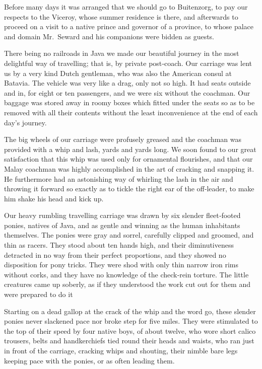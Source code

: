 \documentclass[12pt]{book}
\begin{document}
Before many days it was arranged that we should go to Buitenzorg, to pay
our respects to the Viceroy, whose summer residence is there, and afterwards to
proceed on a visit to a native prince and governor of a province, to whose palace
and domain Mr.~Seward and his companions were bidden as guests.

There being no railroads in Java we made our beautiful journey in the most
delightful way of travelling; that is, by private post‐coach. Our carriage was lent
us by a very kind Dutch gentleman, who was also the American consul at Batavia.
The vehicle was very like a drag, only not so high. It had seats outside and in, for
eight or ten passengers, and we were six without the coachman. Our baggage
was stored away in roomy boxes which fitted under the seats so as to be removed
with all their contents without the least inconvenience at the end of each day’s
journey.

The big wheels of our carriage were profusely greased and the coachman was
provided with a whip and lash, yards and yards long. We soon found to our great
satisfaction that this whip was used only for ornamental flourishes, and that our
Malay coachman was highly accomplished in the art of cracking and snapping
it. He furthermore had an astonishing way of whirling the lash in the air and
throwing it forward so exactly as to tickle the right ear of the off‐leader, to make
him shake his head and kick up.

Our heavy rumbling travelling carriage was drawn by six slender fleet‐footed
ponies, natives of Java, and as gentle and winning as the human inhabitants themselves. The ponies were gray and sorrel, carefully clipped and groomed, and thin
as racers. They stood about ten hands high, and their diminutiveness detracted in
no way from their perfect proportions, and they showed no disposition for pony
tricks. They were shod with only thin narrow iron rims without corks, and they
have no knowledge of the check‐rein torture. The little creatures came up soberly,
as if they understood the work cut out for them and were prepared to do it

Starting on a dead gallop at the crack of the whip and the word go, these
slender ponies never slackened pace nor broke step for five miles. They were
stimulated to the top of their speed by four native boys, of about twelve, who
wore short calico trousers, belts and handkerchiefs tied round their heads and
waists, who ran just in front of the carriage, cracking whips and shouting, their
nimble bare legs keeping pace with the ponies, or as often leading them.
\end{document}
